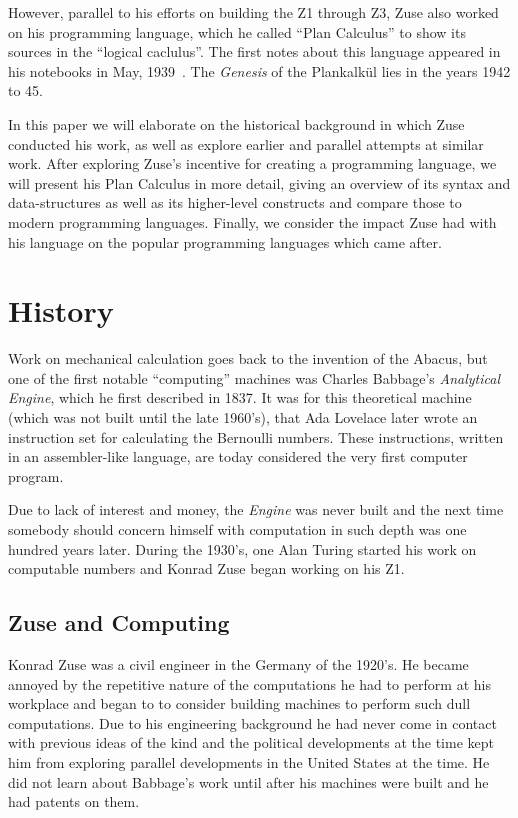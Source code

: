 \documentclass{llncs}
\begin{document}
   However, parallel to his efforts on building the Z1 through Z3, Zuse
   also worked on his programming language, which he called ``Plan Calculus''
   to show its sources in the ``logical caclulus''. The first notes about
   this language appeared in his notebooks in May, 1939~\cite{rojas2002konrad}. The \emph{Genesis}
   of the Plankalkül lies in the years 1942 to 45.

   In this paper we will elaborate on the historical background in which 
   Zuse conducted his work, as well as explore earlier and parallel attempts 
   at similar work. After exploring Zuse's incentive for creating a programming 
   language, we will present his Plan Calculus in more detail, giving an overview 
   of its syntax and data-structures as well as its higher-level constructs and compare 
   those to modern programming languages. Finally, we consider the impact Zuse
   had with his language on the popular programming languages which came after.
 \section{History}
   Work on mechanical calculation goes back to the invention of the Abacus, but one 
   of the first notable ``computing'' machines was Charles Babbage's \emph{Analytical Engine},
   which he first described in 1837. It was for this theoretical machine (which was not built until the 
   late 1960's), that Ada Lovelace later wrote an instruction set for calculating the Bernoulli numbers.
   These instructions, written in an assembler-like language, are today considered the very first computer program.

   Due to lack of interest and money, the \emph{Engine} was never built and the next 
   time somebody should concern himself with computation in such depth was 
   one hundred years later. During the 1930's, one Alan Turing started his work on computable numbers
   and Konrad Zuse began working on his Z1.
 \subsection{Zuse and Computing}
   Konrad Zuse was a civil engineer in the Germany of the 1920's. He became annoyed by
   the repetitive nature of the computations he had to perform at his workplace and began to 
   to consider building machines to perform such dull computations.
   Due to his engineering background he had never come in contact with previous 
   ideas of the kind and the political developments at the time kept him 
   from exploring parallel developments in the United States at the time. He did not learn
   about Babbage's work until after his machines were built and he had patents on them\cite{epegmagHorstzuse}.
\end{document}

